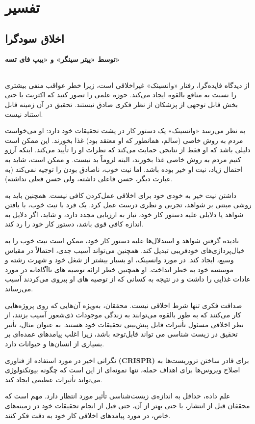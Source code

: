 {
\section*{تفسیر}
\label{sec:تفسیر}


\subsection*{اخلاق سودگرا}
\label{subsec:اخلاق سودگرا}
\textbf{توسط «پیتر سینگر» و «ییپ فای تسه»}
\\\\
}
از دیدگاه فایده‌گرا، رفتار «وانسینک» غیراخلاقی است، زیرا خطر عواقب منفی بیشتری را نسبت به منافع بالقوه ایجاد می‌کند.
حوزه علمی را تصور کنید که اکثریت یا حتی بخش قابل توجهی از پزشکان از نظر فکری صادق نیستند.
تحقیق در آن زمینه قابل استناد نیست.

به نظر می‌رسد «وانسینک» یک دستور کار در پشت تحقیقات خود دارد: او می‌خواست مردم به روش خاصی (سالم، همانطور که او معتقد بود) غذا بخورند.
این ممکن است دلیلی باشد که او فقط از نتایجی حمایت می‌کند که نظرات او را تأیید می‌کند.
اینکه آرزو کنیم مردم به روش خاصی غذا بخورند، البته لزوماً بد نیست.
و ممکن است، شاید به احتمال زیاد، نیت او خیر بوده باشد.
اما نیت خوب، ناصادق بودن را توجیه نمی‌کند (به عبارت دیگر، حسن فاعلی داشته، ولی حسن فعلی نداشته).

داشتن نیت خیر به خودی خود برای اخلاقی عمل‌کردن کافی نیست.
همچنین باید به روشی مبتنی بر شواهد، تجربی و نظری درست عمل کرد.
یک فرد با نیت خوب، با یافتن شواهد یا دلایلی علیه دستور کار خود، نیاز به ارزیابی مجدد دارد، و شاید، اگر دلایل به اندازه کافی قوی باشد، دستور کار خود را رد کند.

نادیده گرفتن شواهد و استدلال‌ها علیه دستور کار خود، ممکن است نیت خوب را به خیال‌پردازی‌های خودفریبی تبدیل کند.
همچنین می‌تواند آسیب جدی، احتمالاً در مقیاس وسیع، ایجاد کند.
در مورد وانسینک، او بسیار بیشتر از شغل خود و شهرت رشته و موسسه خود به خطر انداخت.
او همچنین خطر ارائه توصیه های ناآگاهانه در مورد عادات غذایی را داشت و در نتیجه به کسانی که از توصیه های او پیروی می‌کردند آسیب می‌رساند.

صداقت فکری تنها شرط اخلاقی نیست.
محققان، به‌ویژه آن‌هایی که روی پروژه‌هایی کار می‌کنند که به طور بالقوه می‌توانند به زندگی موجودات ذی‌شعور آسیب بزنند، از نظر اخلاقی مسئول تأثیرات قابل پیش‌بینی تحقیقات خود هستند.
به عنوان مثال، تأثیر تحقیق در زیست شناسی می تواند قابل‌توجه باشد، زیرا اغلب پیامدهای عمده‌ای بر بسیاری از انسان‌ها و حیوانات دارد.

نگرانی اخیر در مورد استفاده از فناوری \textenglish{\textbf{(CRISPR)}} برای قادر ساختن تروریست‌ها به اصلاح ویروس‌ها برای اهداف حمله، تنها نمونه‌ای از این است که چگونه بیوتکنولوژی می‌تواند تأثیرات عظیمی ایجاد کند.

علم داده، حداقل به اندازه‌ی زیست‌شناسی تأثیر مورد انتظار دارد.
مهم است که محققان قبل از انتشار، یا حتی بهتر از آن، حتی قبل از انجام تحقیقات خود در زمینه‌های خاص، در مورد پیامدهای اخلاقی کار خود به دقت فکر کنند.



